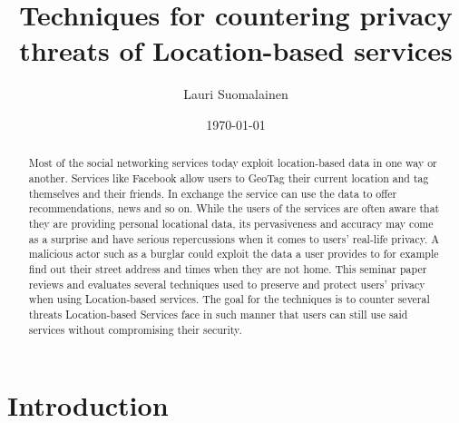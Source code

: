 \documentclass[english]{tktltiki2}
\title{Techniques for countering privacy threats of Location-based services}
\author{Lauri Suomalainen}
\date{\today}
\theoremstyle{definition}
\theoremstyle{remark}
\begin{document}

\frontmatter      %

\maketitle        %
\makeabstract     %

\tableofcontents  %


\mainmatter 
\onehalfspacing
\begin{abstract}


Most of the social networking services today exploit location-based data in one way or another. Services like Facebook allow users to GeoTag their current location and tag themselves and their friends. In exchange the service can use the data to offer recommendations, news and so on.  While the users of the services are often aware that they are providing personal locational data, its pervasiveness and accuracy may come as a surprise and have serious repercussions when it comes to users' real-life privacy. A malicious actor such as a burglar could exploit the data a user provides to for example find out their street address and times when they are not home.
This seminar paper reviews and evaluates several techniques used to preserve and protect users' privacy when using Location-based services. The goal for the techniques is to counter several threats Location-based Services face in such manner that users can still use said services without compromising their security.

\end{abstract}

\section{Introduction}
\end{document}
